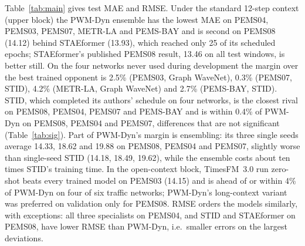 Table~\ref{tab:main} gives test MAE and RMSE. Under the standard 12-step context (upper block) the PWM-Dyn ensemble
has the lowest MAE on PEMS04, PEMS03, PEMS07, METR-LA and PEMS-BAY and is second on PEMS08 (14.12) behind STAEformer
(13.93), which reached only 25 of its scheduled epochs; STAEformer's published PEMS08 result, 13.46 on all test
windows, is better still. On the four networks never used during development the margin over the best trained
opponent is 2.5\% (PEMS03, Graph WaveNet), 0.3\% (PEMS07, STID), 4.2\% (METR-LA, Graph WaveNet) and 2.7\% (PEMS-BAY,
STID). STID, which completed its authors' schedule on four networks, is the closest rival on PEMS08, PEMS04, PEMS07 and
PEMS-BAY and is within 0.4\% of PWM-Dyn on PEMS08, PEMS04 and PEMS07, differences that are not significant
(Table~\ref{tab:sig}). Part of PWM-Dyn's margin is ensembling: its three single
seeds average 14.33, 18.62 and 19.88 on PEMS08, PEMS04 and PEMS07, slightly worse than single-seed STID (14.18, 18.49,
19.62), while the ensemble costs about ten times STID's training time. In the open-context block, TimesFM~3.0 run zero-shot beats
every trained model on PEMS03 (14.15) and is ahead of or within 4\% of PWM-Dyn on four of six traffic networks;
PWM-Dyn's long-context variant was preferred on validation only for PEMS08. RMSE orders the models similarly, with
exceptions: all three specialists on PEMS04, and STID and STAEformer on PEMS08, have lower RMSE than PWM-Dyn, i.e.\
smaller errors on the largest deviations.
